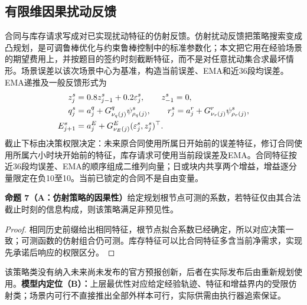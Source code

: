 \documentclass[UTF8,a4paper,zihao=-4,fontset=mac]{ctexart}
\newcommand{\pp}[2]{\par\ifdim\dimexpr\pagegoal-\pagetotal\relax<5\baselineskip\newpage\fi\noindent\textbf{命题 #1（#2）}\quad}
\begin{document}
\subsection{有限维因果扰动反馈}
合同与库存请求写成对已实现扰动特征的仿射反馈。仿射扰动反馈把策略搜索变成凸规划，是可调鲁棒优化与约束鲁棒控制中的标准参数化\cite{bental2004,goulart2006}；本文把它用在经验场景的期望费用上，并按题目的签约时刻截断特征，而不是对任意扰动集合求最坏情形。场景误差以该次场景中心为基准，构造当前误差、EMA和近36段均误差。EMA递推及一般反馈形式为
\begin{align}
 z_j^s&=0.8z_{j-1}^s+0.2\varepsilon_j^s,\qquad z_{-1}^s=0,\label{eq:ema}\\
 q_j^s&=a_j^q+G_{\nu_q(j)}^q\psi_{\rho_q(j)}^s,\qquad
 r_j^s=a_j^r+G_{\nu_r(j)}^r\psi_{\rho_r(j)}^s,\label{eq:affine}\\
 E_{j+1}^s&=a_j^E+G_{\nu_E(j)}^E(\varepsilon_j^s,z_j^s)^\top.\notag
\end{align}
截止下标由决策权限决定：未来原合同使用所属日开始前的误差特征，修订合同使用所属六小时块开始前的特征，库存请求可使用当前段误差及EMA。合同特征按近36段均误差、EMA的顺序组成二维列向量；日或块内共享两个增益，增益逐分量限定在负10至10。当前已锁定的合同不是自由变量。

\pp{7}{A：仿射策略的因果性}给定规划根节点可测的系数，若特征仅由其合法截止时刻的信息构成，则该策略满足非预见性。
\begin{proof}
相同历史前缀给出相同特征，根节点拟合系数已经确定，所以对应决策一致；可测函数的仿射组合仍可测。库存特征可以比合同特征多含当前净需求，实现先承诺后响应的权限区分。
\end{proof}
该策略类没有纳入未来尚未发布的官方预报创新，后者在实际发布后由重新规划使用。\textbf{模型内定位（B）：}上层最优性对应给定经验轨迹、特征和增益界内的受限仿射类；场景内可行不直接推出全部外样本可行，实际供需由执行器追索保证。
\end{document}
